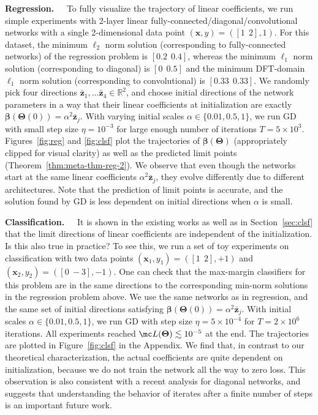 \documentclass{article} %
\def\vx{{\bm{x}}}
\def\vz{{\bm{z}}}
\newcommand{\R}{\mathbb{R}}
\newcommand{\vbeta}{{\bm{\beta}}}
\newcommand{\bTheta}{\bm{\Theta}}
\begin{document}
\textbf{Regression.~~}
To fully visualize the trajectory of linear coefficients, we run simple experiments with 2-layer linear fully-connected/diagonal/convolutional networks with a single 2-dimensional data point $(\vx,y) = ([1~~2],1)$. For this dataset, the minimum $\ell_2$ norm solution (corresponding to fully-connected networks) of the regression problem is $[0.2~~0.4]$, whereas the minimum $\ell_1$ norm solution (corresponding to diagonal) is $[0~~0.5]$ and the minimum DFT-domain $\ell_1$ norm solution (corresponding to convolutional) is $[0.33~~0.33]$.
We randomly pick four directions $\bar \vz_1, \dots \bar \vz_4 \in \R^2$, and choose initial directions of the network parameters in a way that their linear coefficients at initialization are exactly $\vbeta(\bTheta(0)) = \alpha^2 \bar \vz_j$. With varying initial scales $\alpha \in \{0.01, 0.5, 1\}$, we run GD with small step size $\eta = 10^{-3}$ for large enough number of iterations $T = 5 \times 10^3$. Figures~\ref{fig:reg} and \ref{fig:clsf} plot the trajectories of $\vbeta(\bTheta)$ (appropriately clipped for visual clarity) as well as the predicted limit points (Theorem~\ref{thm:meta-thm-reg-2}). We observe that even though the networks start at the same linear coefficients $\alpha^2 \bar \vz_j$, they evolve differently due to different architectures. Note that the prediction of limit points is accurate, and the solution found by GD is less dependent on initial directions when $\alpha$ is small.

\textbf{Classification.~~}
It is shown in the existing works as well as in Section~\ref{sec:clsf} that the limit directions of linear coefficients are independent of the initialization. Is this also true in practice? To see this, we run a set of toy experiments on classification with two data points $(\vx_1,y_1) = ([1~~2],+1)$ and $(\vx_2,y_2) = ([0~-\!3],-1)$. One can check that the max-margin classifiers for this problem are in the same directions to the corresponding min-norm solutions in the regression problem above. We use the same networks as in regression, and the same set of initial directions satisfying $\vbeta(\bTheta(0)) = \alpha^2 \bar \vz_j$. With initial scales $\alpha \in \{0.01, 0.5, 1\}$, we run GD with step size $\eta = 5 \times 10^{-4}$ for $T = 2 \times 10^6$ iterations. All experiments reached $\mc L(\bTheta) \lesssim 10^{-5}$ at the end. The trajectories are plotted in Figure~\ref{fig:clsf} in the Appendix. We find that, in contrast to our theoretical characterization, the actual coefficients are quite dependent on initialization, because we do not train the network all the way to zero loss. This observation is also consistent with a recent analysis \citep{moroshko2020implicit} for diagonal networks, and suggests that understanding the behavior of iterates after a finite number of steps is an important future work.
\end{document}
